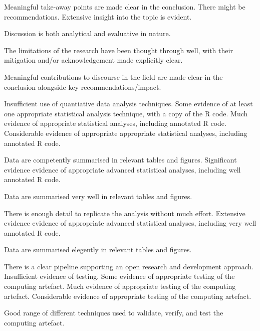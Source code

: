 \begin{markingrubric}
        \par		Meaningful take-away points are made clear in the conclusion. There might be recommendations.
        \grade		Extensive insight into the topic is evident.
        \par		Discussion is both analytical and evaluative in nature.
        \par		The limitations of the research have been thought through well, with their mitigation and/or acknowledgement made explicitly clear.
        \par		Meaningful contributions to discourse in the field are made clear in the conclusion alongside key recommendations/impact.       
%
\end{markingrubric}

\begin{markingrubric}
%
        \grade\fail       Insufficient use of quantiative data analysis techniques.
        \grade		Some evidence of at least one appropriate statistical analysis technique, with a copy of the R code.
        \grade		Much evidence of appropriate statistical analyses, including annotated R code.
        \grade		Considerable evidence of appropriate appropriate statistical analyses, including annotated R code.
        \par		Data are competently summarised in relevant tables and figures.
        \grade		Significant evidence evidence of appropriate advanced statistical analyses, including well annotated R code.
        \par		Data are summarised very well in relevant tables and figures.
        \par		There is enough detail to replicate the analysis without much effort.
        \grade		Extensive evidence evidence of appropriate advanced statistical analyses, including very well annotated R code.
        \par		Data are summarised elegently in relevant tables and figures.
        \par		There is a clear pipeline supporting an open research and development approach.
%
        \grade\fail       Insufficient evidence of testing.
        \grade		Some evidence of appropriate testing of the computing artefact.
        \grade		Much evidence of appropriate testing of the computing artefact.
        \grade		Considerable evidence of appropriate testing of the computing artefact.
        \par		Good range of different techniques used to validate, verify, and test the computing artefact.

\end{markingrubric}
